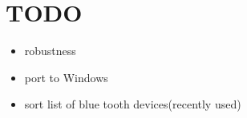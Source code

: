 \documentclass[ddc nogerman]{tudbeamer}
\begin{document}
\section{TODO}
\begin{frame}
    \begin{itemize}
        \item robustness
        \item port to Windows
        \item sort list of blue tooth devices(recently used)
    \end{itemize}
\end{frame}
\end{document}
